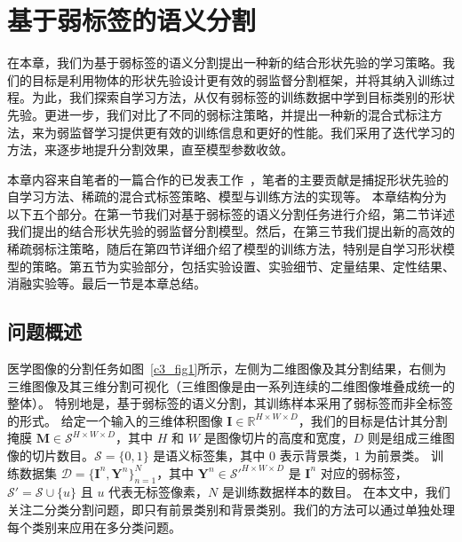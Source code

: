 \chapter{基于弱标签的语义分割}

在本章，我们为基于弱标签的语义分割提出一种新的结合形状先验的学习策略。我们的目标是利用物体的形状先验设计更有效的弱监督分割框架，并将其纳入训练过程。为此，我们探索自学习方法，从仅有弱标签的训练数据中学到目标类别的形状先验。更进一步，我们对比了不同的弱标注策略，并提出一种新的混合式标注方法，来为弱监督学习提供更有效的训练信息和更好的性能。我们采用了迭代学习的方法，来逐步地提升分割效果，直至模型参数收敛。

本章内容来自笔者的一篇合作的已发表工作~\cite{he2021weakly}，笔者的主要贡献是捕捉形状先验的自学习方法、稀疏的混合式标签策略、模型与训练方法的实现等。
本章结构分为以下五个部分。在第一节我们对基于弱标签的语义分割任务进行介绍，第二节详述我们提出的结合形状先验的弱监督分割模型。然后，在第三节我们提出新的高效的稀疏弱标注策略，随后在第四节详细介绍了模型的训练方法，特别是自学习形状模型的策略。第五节为实验部分，包括实验设置、实验细节、定量结果、定性结果、消融实验等。最后一节是本章总结。

\section{问题概述}
医学图像的分割任务如图~\ref{c3_fig1}所示，左侧为二维图像及其分割结果，右侧为三维图像及其三维分割可视化（三维图像是由一系列连续的二维图像堆叠成统一的整体）。
特别地是，基于弱标签的语义分割，其训练样本采用了弱标签而非全标签的形式。
给定一个输入的三维体积图像 $\mathbf{I} \in \mathbb{R}^{H \times W \times D}$，我们的目标是估计其分割掩膜 $\mathbf{M} \in \mathcal{S}^{H \times W \times D}$，其中 $H$ 和 $W$ 是图像切片的高度和宽度，$D$ 则是组成三维图像的切片数目。$\mathcal{S} = \{0, 1\}$ 是语义标签集，其中 $0$ 表示背景类，$1$ 为前景类。
训练数据集 $\mathcal{D} = \{\mathbf{I}^n, \mathbf{Y}^n\}_{n=1}^N$，其中 $\mathbf{Y}^n \in \mathcal{S}'^{H \times W \times D}$ 是 $\mathbf{I}^n$ 对应的弱标签， $\mathcal{S}' = \mathcal{S} \cup \{u\}$ 且 $u$ 代表无标签像素，$N$ 是训练数据样本的数目。
在本文中，我们关注二分类分割问题，即只有前景类别和背景类别。我们的方法可以通过单独处理每个类别来应用在多分类问题。

